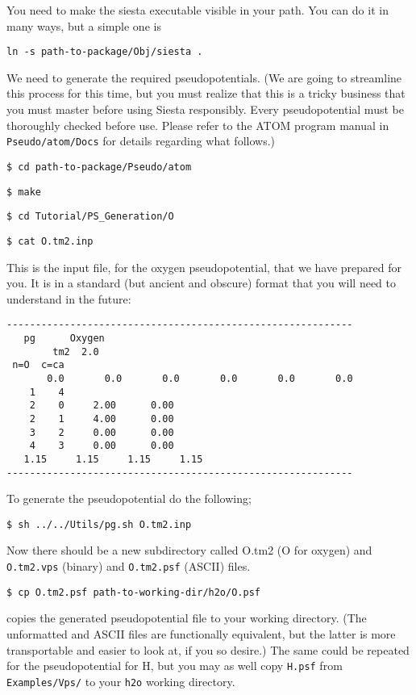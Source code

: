 \documentclass[11pt]{article}
\begin{document}
You need to make the siesta executable visible in your path. 
You can do it in many ways, but a simple one is

{\tt ln -s  path-to-package/Obj/siesta .}

\noindent
We need to generate the required pseudopotentials.
(We are going to streamline this process for this time, but
you must realize that this is a tricky business that you
must master before using {\sc Siesta} responsibly. Every
pseudopotential must be thoroughly checked before use. Please refer to
the {\sc ATOM} program manual in {\tt Pseudo/atom/Docs}
for details regarding what follows.)

{\tt \$ cd path-to-package/Pseudo/atom}

{\tt \$ make}

{\tt \$ cd Tutorial/PS\_Generation/O}

{\tt \$ cat O.tm2.inp}

\noindent
This is the input file, for the oxygen pseudopotential,
that we have prepared for you.
It is in a standard (but ancient and obscure) format that
you will need to understand in the future:
\begin{verbatim}
------------------------------------------------------------
   pg      Oxygen
        tm2  2.0
 n=O  c=ca
       0.0       0.0       0.0       0.0       0.0       0.0
    1    4
    2    0     2.00      0.00
    2    1     4.00      0.00
    3    2     0.00      0.00
    4    3     0.00      0.00
   1.15     1.15     1.15     1.15
------------------------------------------------------------
\end{verbatim}

To generate the pseudopotential do the following;

{\tt \$ sh ../../Utils/pg.sh O.tm2.inp}

\noindent
Now there should be a new subdirectory called O.tm2 (O for oxygen)
and {\tt O.tm2.vps} (binary) and {\tt O.tm2.psf} (ASCII) files.

{\tt \$ cp O.tm2.psf path-to-working-dir/h2o/O.psf}

\noindent
copies the generated pseudopotential file to your working directory.
(The unformatted and ASCII files are functionally equivalent, but
the latter is more transportable and easier to look at, if you so
desire.) The same could be repeated for the pseudopotential for H,
but you may as well copy {\tt H.psf} from {\tt Examples/Vps/}
to your {\tt h2o} working directory.
\end{document}
